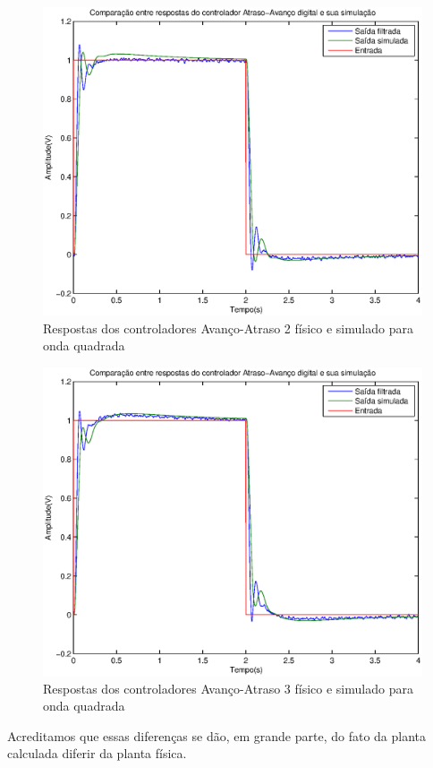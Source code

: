 \documentclass{article}
\begin{document}
\begin{figure}[H]
	\centering
	\includegraphics[width=0.8\linewidth]{yrsim50}
	\caption{Respostas dos controladores Avanço-Atraso 2 físico e simulado para onda quadrada}
	\label{fig:yrsim50}
\end{figure}
\begin{figure}[H]
	\centering
	\includegraphics[width=0.8\linewidth]{yrsim55}
	\caption{Respostas dos controladores Avanço-Atraso 3 físico e simulado para onda quadrada}
	\label{fig:yrsim55}
\end{figure}
Acreditamos que essas diferenças se dão, em grande parte, do fato da planta calculada diferir da planta física.
\end{document}
